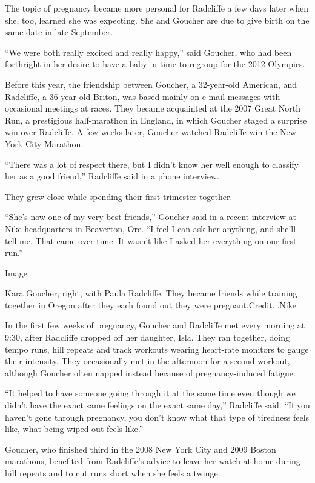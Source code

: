 The topic of pregnancy became more personal for Radcliffe a few days
later when she, too, learned she was expecting. She and Goucher are due
to give birth on the same date in late September.

``We were both really excited and really happy,'' said Goucher, who had
been forthright in her desire to have a baby in time to regroup for the
2012 Olympics.

Before this year, the friendship between Goucher, a 32-year-old
American, and Radcliffe, a 36-year-old Briton, was based mainly on
e-mail messages with occasional meetings at races. They became
acquainted at the 2007 Great North Run, a prestigious half-marathon in
England, in which Goucher staged a surprise win over Radcliffe. A few
weeks later, Goucher watched Radcliffe win the New York City Marathon.

``There was a lot of respect there, but I didn't know her well enough to
classify her as a good friend,'' Radcliffe said in a phone interview.

They grew close while spending their first trimester together.

``She's now one of my very best friends,'' Goucher said in a recent
interview at Nike headquarters in Beaverton, Ore. ``I feel I can ask her
anything, and she'll tell me. That came over time. It wasn't like I
asked her everything on our first run.''

Image

Kara Goucher, right, with Paula Radcliffe. They became friends while
training together in Oregon after they each found out they were
pregnant.Credit...Nike

In the first few weeks of pregnancy, Goucher and Radcliffe met every
morning at 9:30, after Radcliffe dropped off her daughter, Isla. They
ran together, doing tempo runs, hill repeats and track workouts wearing
heart-rate monitors to gauge their intensity. They occasionally met in
the afternoon for a second workout, although Goucher often napped
instead because of pregnancy-induced fatigue.

``It helped to have someone going through it at the same time even
though we didn't have the exact same feelings on the exact same day,''
Radcliffe said. ``If you haven't gone through pregnancy, you don't know
what that type of tiredness feels like, what being wiped out feels
like.''

Goucher, who finished third in the 2008 New York City and 2009 Boston
marathons, benefited from Radcliffe's advice to leave her watch at home
during hill repeats and to cut runs short when she feels a twinge.

